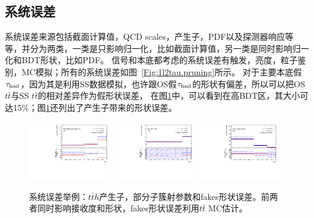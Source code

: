 \subsection{系统误差}\label{sec:1l2tau_sys}
\ltwotau 系统误差来源包括截面计算值，QCD scales，产生子，PDF以及探测器响应等等，并分为两类，一类是只影响归一化，比如截面计算值，另一类是同时影响归一化和BDT形状，比如PDF。
信号和本底都考虑的系统误差有触发，亮度，粒子鉴别，MC模拟；所有的系统误差如图~\ref{Fig:1l2tau.pruning}所示。
对于主要本底假$\tau_{\text{had}}$，因为其是利用SS数据模拟，也许跟OS假$\tau_{\text{had}}$的形状有偏差，所以可以把OS $t\bar{t}$与SS $t\bar{t}$的相对差异作为假\tauhad 形状误差，
在图\ref{Fig:1l2tau.shapesys}中，可以看到在高BDT区，其大小可达15\%；图\ref{Fig:1l2tau.shapesys}还列出了产生子带来的形状误差。
\begin{figure}[htbp]
\centering
\begin{center}
  \includegraphics[width=0.32\textwidth, angle=-90, keepaspectratio]{fig/OneLepTwoTaus/Plots_tth-signal_MCsys.pdf}
  \includegraphics[width=0.32\textwidth, angle=-90, keepaspectratio]{fig/OneLepTwoTaus/Plots_ttV-signal_MCsys.pdf}
  \includegraphics[width=0.32\textwidth, angle=-90, keepaspectratio]{fig/OneLepTwoTaus/h1l2tau_Fakes.pdf}
\end{center}
\caption{系统误差举例：$t\bar{t}h$产生子，部分子簇射参数和fakes形状误差。前两者同时影响接收度和形状，fakes形状误差利用$t\bar{t}$ MC估计。}
\label{Fig:1l2tau.shapesys}
\end{figure}
